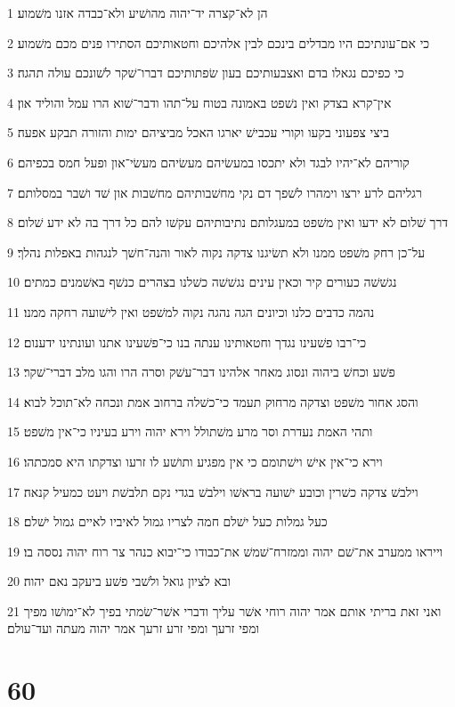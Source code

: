 \par 1 הן לא־קצרה יד־יהוה מהושׁיע ולא־כבדה אזנו משׁמוע׃
\par 2 כי אם־עונתיכם היו מבדלים בינכם לבין אלהיכם וחטאותיכם הסתירו פנים מכם משׁמוע׃
\par 3 כי כפיכם נגאלו בדם ואצבעותיכם בעון שׂפתותיכם דברו־שׁקר לשׁונכם עולה תהגה׃
\par 4 אין־קרא בצדק ואין נשׁפט באמונה בטוח על־תהו ודבר־שׁוא הרו עמל והוליד און׃
\par 5 ביצי צפעוני בקעו וקורי עכבישׁ יארגו האכל מביציהם ימות והזורה תבקע אפעה׃
\par 6 קוריהם לא־יהיו לבגד ולא יתכסו במעשׂיהם מעשׂיהם מעשׂי־און ופעל חמס בכפיהם׃
\par 7 רגליהם לרע ירצו וימהרו לשׁפך דם נקי מחשׁבותיהם מחשׁבות און שׁד ושׁבר במסלותם׃
\par 8 דרך שׁלום לא ידעו ואין משׁפט במעגלותם נתיבותיהם עקשׁו להם כל דרך בה לא ידע שׁלום׃
\par 9 על־כן רחק משׁפט ממנו ולא תשׂיגנו צדקה נקוה לאור והנה־חשׁך לנגהות באפלות נהלך׃
\par 10 נגשׁשׁה כעורים קיר וכאין עינים נגשׁשׁה כשׁלנו בצהרים כנשׁף באשׁמנים כמתים׃
\par 11 נהמה כדבים כלנו וכיונים הגה נהגה נקוה למשׁפט ואין לישׁועה רחקה ממנו׃
\par 12 כי־רבו פשׁעינו נגדך וחטאותינו ענתה בנו כי־פשׁעינו אתנו ועונתינו ידענום׃
\par 13 פשׁע וכחשׁ ביהוה ונסוג מאחר אלהינו דבר־עשׁק וסרה הרו והגו מלב דברי־שׁקר׃
\par 14 והסג אחור משׁפט וצדקה מרחוק תעמד כי־כשׁלה ברחוב אמת ונכחה לא־תוכל לבוא׃
\par 15 ותהי האמת נעדרת וסר מרע משׁתולל וירא יהוה וירע בעיניו כי־אין משׁפט׃
\par 16 וירא כי־אין אישׁ וישׁתומם כי אין מפגיע ותושׁע לו זרעו וצדקתו היא סמכתהו׃
\par 17 וילבשׁ צדקה כשׁרין וכובע ישׁועה בראשׁו וילבשׁ בגדי נקם תלבשׁת ויעט כמעיל קנאה׃
\par 18 כעל גמלות כעל ישׁלם חמה לצריו גמול לאיביו לאיים גמול ישׁלם׃
\par 19 וייראו ממערב את־שׁם יהוה וממזרח־שׁמשׁ את־כבודו כי־יבוא כנהר צר רוח יהוה נססה בו׃
\par 20 ובא לציון גואל ולשׁבי פשׁע ביעקב נאם יהוה׃
\par 21 ואני זאת בריתי אותם אמר יהוה רוחי אשׁר עליך ודברי אשׁר־שׂמתי בפיך לא־ימושׁו מפיך ומפי זרעך ומפי זרע זרעך אמר יהוה מעתה ועד־עולם׃

\chapter{60}

